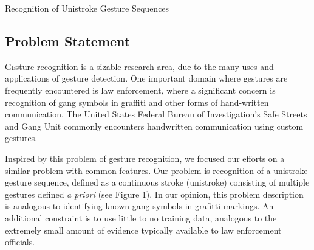 \documentclass[twoside]{article}
\begin{document}
\centerline{Recognition of Unistroke Gesture Sequences}
\normalsize


\begin{multicols}{2} %

\section{Problem Statement}
\lettrine[nindent=0em,lines=2]{G}esture recognition is a sizable research area,
due to the many uses and applications of gesture detection.
One important domain where gestures are frequently encountered is law
enforcement, where a significant concern is recognition of gang symbols in
graffiti and other forms of hand-written communication. The United States
Federal Bureau of Investigation's Safe Streets and Gang Unit commonly encounters
handwritten communication using custom gestures\cite{lyddane_donald_united_2006}. 

Inspired by this problem of gesture recognition, we focused our efforts on a
similar problem with common features. Our problem is recognition of a unistroke
gesture sequence, defined as a continuous stroke (unistroke) consisting of
multiple gestures defined \textit{a priori} (see Figure 1). In our opinion, this
problem description is analogous to identifying known gang symbols in grafitti
markings. An additional constraint is to use little to no training data, analogous to the
extremely small amount of evidence typically available to law enforcement officials.



\end{multicols}
\end{document}
